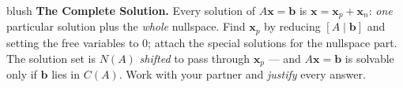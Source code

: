 \documentclass[10pt]{article}
\newcommand{\xx}{\mathbf{x}}
\newcommand{\bb}{\mathbf{b}}
\begin{document}
\namepartnerperiod

\vspace{0.10in}

\begin{headlinebox}{blush}
\small\textbf{The Complete Solution.} Every solution of $A\xx=\bb$ is $\xx=\xx_p+\xx_n$: \emph{one}
particular solution plus the \emph{whole} nullspace. Find $\xx_p$ by reducing $[A\mid\bb]$ and setting
the free variables to $0$; attach the special solutions for the nullspace part. The solution set is
$N(A)$ \emph{shifted} to pass through $\xx_p$ --- and $A\xx=\bb$ is solvable only if $\bb$ lies in $C(A)$.
Work with your partner and \emph{justify} every answer.
\end{headlinebox}

\vspace{0.10in}
\end{document}
